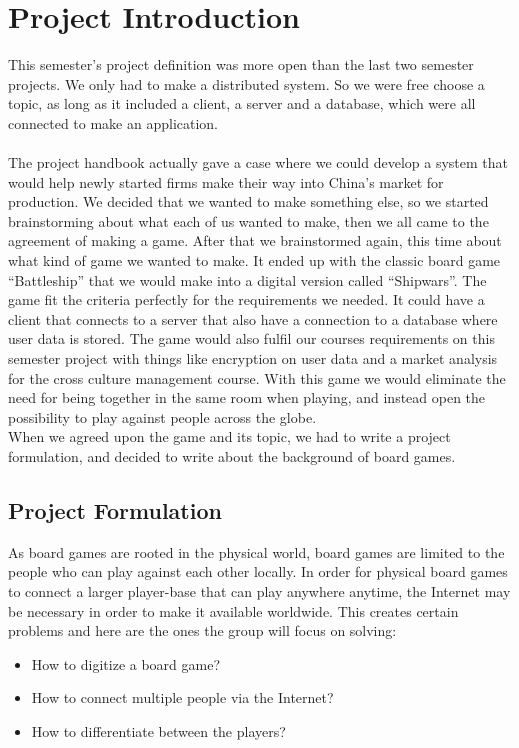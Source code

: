
\section{Project Introduction}

	This semester’s project definition was more open than the last
	 two semester projects. We only had to make a distributed system.
	  So we were free choose a topic, as long as it included a client,
		 a server and a database, which were all connected to make an application.
	\\
	\\
	The project handbook actually gave a case where we could develop
	 a system that would help newly started firms make their way into
	  China’s market for production. We decided that we wanted to
		make something else, so we started brainstorming about what
		 each of us wanted to make, then we all came to the agreement
		  of making a game. After that we brainstormed again, this time
			 about what kind of game we wanted to make. It ended up with
			  the classic board game “Battleship” that we would make into
				 a digital version called “Shipwars”. The game fit the criteria
				 perfectly for the requirements we needed. It could have a client
				 that connects to a server that also have a connection to a database
				  where user data is stored. The game would also fulfil our courses
					requirements on this semester project with things like encryption on
					 user data and a market analysis for the cross culture
					  management course. With this game we would eliminate
						the need for being together in the same room when playing, and
						 instead open the possibility to play against people across
						 the globe.
	\\
When we agreed upon the game and its topic, we had to write a project
formulation, and decided to write about the background of board games.
	\\
	\subsection{Project Formulation}

	As board games are rooted in the physical world, board games are limited
	 to the people who can play against each other locally. In order for
	 physical board games to connect a larger player-base that can play anywhere
	  anytime, the Internet may be necessary in order to make it available
		 worldwide. This creates certain problems and here are the ones the
		  group will focus on solving:
	\begin{itemize}
		\item How to digitize a board game?
		\item How to connect multiple people via the Internet?
		\item How to differentiate between the players?
	\end{itemize}
